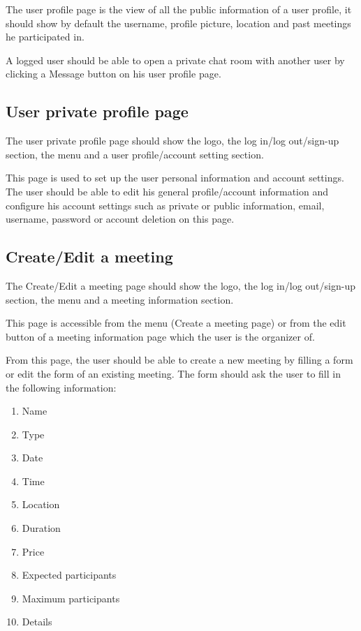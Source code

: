 \documentclass[conference]{IEEEtran}
\begin{document}
The user profile page is the view of all the public information of a user profile, it should show by default the username, profile picture, location and past meetings he participated in.

A logged user should be able to open a private chat room with another user by clicking a Message button on his user profile page.

\subsection{User private profile page}

The user private profile page should show the logo, the log in/log out/sign-up section, the menu and a user profile/account setting section.

This page is used to set up the user personal information and account settings.
The user should be able to edit his general profile/account information and configure his account settings such as private or public information, email, username, password or account deletion on this page.

\subsection{Create/Edit a meeting}

The Create/Edit a meeting page should show the logo, the log in/log out/sign-up section, the menu and a meeting information section.

This page is accessible from the menu (Create a meeting page) or from the edit button of a meeting information page which the user is the organizer of.

From this page, the user should be able to create a new meeting by filling a form or edit the form of an existing meeting.
The form should ask the user to fill in the following information:

\begin{enumerate}
    \item Name
    \item Type
    \item Date
    \item Time
    \item Location
    \item Duration
    \item Price
    \item Expected participants
    \item Maximum participants
    \item Details
\end{enumerate}
\end{document}
